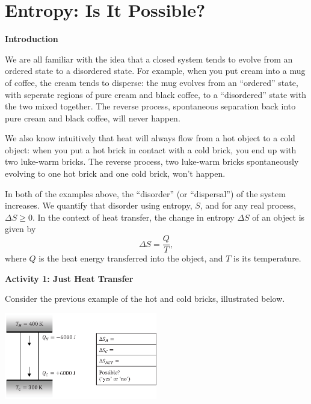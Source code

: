 \section{Entropy: Is It Possible?}

\makelabheader %

\vspace{0.2in}
\textbf{Introduction} 

We are all familiar with the idea that a closed system tends to evolve from an ordered state to a disordered state.  For example, when you put cream into a mug of coffee, the cream tends to disperse: the mug evolves from an ``ordered'' state, with seperate regions of pure cream and black coffee, to a ``disordered'' state with the two mixed together.  The reverse process, spontaneous separation back into pure cream and black coffee, will never happen.

We also know intuitively that heat will always flow from a hot object to a cold object: when you put a hot brick in contact with a cold brick, you end up with two luke-warm bricks.  The reverse process, two luke-warm bricks spontaneously evolving to one hot brick and one cold brick, won't happen.  

In both of the examples above, the ``disorder'' (or ``dispersal'') of the system increases.  We quantify that disorder using entropy, $S$, and for any real process, $\Delta S \geq 0$.  In the context of heat transfer, the change in entropy $\Delta S$ of an object is given by 
\begin{displaymath}
\Delta S = \frac{Q}{T},
\end{displaymath}
where $Q$ is the heat energy transferred into the object, and $T$ is its temperature.  

\vspace{0.3 in}
\textbf{Activity 1: Just Heat Transfer}

Consider the previous example of the hot and cold bricks, illustrated below.

\begin{center}
\vspace{-0.3 in}
\includegraphics[width=0.5\textwidth]{entropy_is_it_possible/fig1.eps}
\vspace{-0.3 in}
\end{center}

